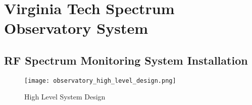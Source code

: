 \documentclass[12pt,sts]{report}
\begin{document}


\pagebreak

\section{Virginia Tech Spectrum Observatory System}

\subsection{RF Spectrum Monitoring System Installation}

\begin{figure}[h!]
  \centering
    \texttt{[image: observatory\_high\_level\_design.png]}
	\caption{High Level System Design}
\end{figure}
\end{document}
